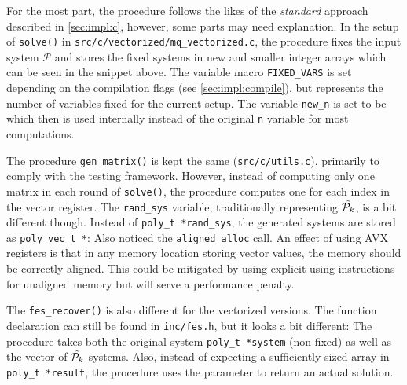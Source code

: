 For the most part, the procedure follows the likes of the \textit{standard} approach described in \cref{sec:impl:c}, however, some parts may need explanation. In the setup of \texttt{solve()} in \texttt{src/c/vectorized/mq\_vectorized.c}, the procedure fixes the input system $\mathcal{P}$ and stores the fixed systems in new and smaller integer arrays
which can be seen in the snippet above. The variable macro \texttt{FIXED\_VARS} is set depending on the compilation flags (see \cref{sec:impl:compile}), but represents the number of variables fixed for the current setup. The variable \texttt{new\_n} is set to be 
which then is used internally instead of the original \texttt{n} variable for most computations.

The procedure \texttt{gen\_matrix()} is kept the same (\texttt{src/c/utils.c}), primarily to comply with the testing framework. However, instead of computing only one matrix in each round of \texttt{solve()}, the procedure computes one for each index in the vector register. The \texttt{rand\_sys} variable, traditionally representing $\Tilde{\mathcal{P}_k}$, is a bit different though. Instead of \texttt{poly\_t *rand\_sys}, the generated systems are stored as \texttt{poly\_vec\_t *}:
Also noticed the \texttt{aligned\_alloc} call. An effect of using AVX registers is that in any memory location storing vector values, the memory should be correctly aligned. This could be mitigated by using explicit using instructions for unaligned memory but will serve a performance penalty.

The \texttt{fes\_recover()} is also different for the vectorized versions. The function declaration can still be found in \texttt{inc/fes.h}, but it looks a bit different:
The procedure takes both the original system \texttt{poly\_t *system} (non-fixed) as well as the vector of $\Tilde{\mathcal{P}_k}$ systems. Also, instead of expecting a sufficiently sized array in \texttt{poly\_t *result}, the procedure uses the parameter to return an actual solution.

